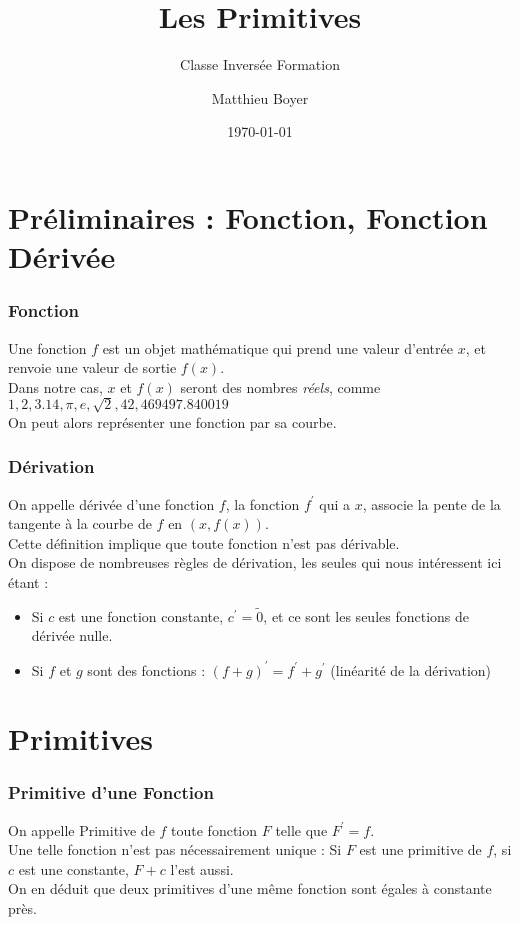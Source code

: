 \documentclass{beamercours}
\title{Les Primitives}
\subtitle{Classe Inversée Formation}
\author{Matthieu Boyer}
\date{\today}
\begin{document}
    \maketitle

    \section{Préliminaires : Fonction, Fonction Dérivée}
            \begin{frame}
                \frametitle{Fonction}
                Une fonction $f$ est un objet mathématique qui prend une valeur d'entrée $x$, et renvoie une valeur de sortie $f(x)$. \\
                Dans notre cas, $x$ et $f(x)$ seront des nombres \textsl{réels}, comme $1, 2, 3.14, \pi, e, \sqrt{2}, 42, 469497.840019$\\
                On peut alors représenter une fonction par sa courbe.   
            \end{frame}

            \begin{frame}
                \frametitle{Dérivation}
                On appelle dérivée d'une fonction $f$, la fonction $f^{'}$ qui a $x$, associe la pente de la tangente à la courbe de $f$ en $(x, f(x))$.\\
                Cette définition implique que toute fonction n'est pas dérivable.\\
                On dispose de nombreuses règles de dérivation, les seules qui nous intéressent ici étant : 
                \begin{itemize} 
                    \item Si $c$ est une fonction constante, $c^{'} = \tilde{0}$, et ce sont les seules fonctions de dérivée nulle.
                    \item Si $f$ et $g$ sont des fonctions : $(f+g)^{'} = f^{'} + g^{'}$ (linéarité de la dérivation)
                \end{itemize}
            \end{frame}

    \section{Primitives}
        \begin{frame}
        \frametitle{Primitive d'une Fonction}
            On appelle Primitive de $f$ toute fonction $F$ telle que $F^{'} = f$.\\
            Une telle fonction n'est pas nécessairement unique : Si $F$ est une primitive de $f$, si $c$ est une constante, $F + c$ l'est aussi.\\
            On en déduit que deux primitives d'une même fonction sont égales à constante près.
        \end{frame}
\end{document}
